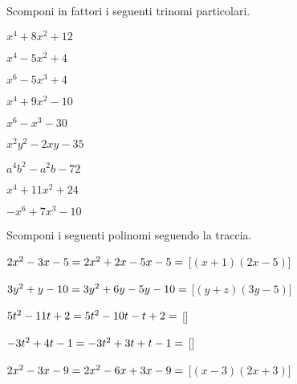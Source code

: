 \begin{esercizio}
 \label{ese:17.5}
 Scomponi in fattori i seguenti trinomi particolari.
 \begin{multicols}{3}
 \begin{enumeratea}
 \item \(x^{4}+8x^{2}+12\)
 \item \(x^{4}-5x^{2}+4\)
 \item \(x^{6}-5x^{3}+4\)
 \item \(x^{4}+9x^{2}-10\)
 \item \(x^{6}-x^{3}-30\)
 \item \(x^{2}y^{2}-2xy-35\)
 \item \(a^{4}b^{2}-a^{2}b-72\)
 \item \(x^{4}+11x^{2}+24\)
 \item \(-x^{6}+7x^{3}-10\)
 \end{enumeratea}
\end{multicols}
\end{esercizio}

\begin{esercizio}[\Ast]
 \label{ese:17.9}
 Scomponi i seguenti polinomi seguendo la traccia.
 \begin{enumeratea}
 \item \(2x^{{2}}-3x-5=2x^{2}+2x-5x-5=\dotfill\) \hfill [\((x+1)(2x-5)\)]
 \item \(3y^{{2}}+y-10 = 3y^{2}+6y-5y-10 =\dotfill\) \hfill [\((y+z)(3y-5)\)]
 \item \(5t^{{2}}-11t+2 = 5t^{2}-10t-t+2 =\dotfill\) \hfill []
 \item \(-3t^{{2}}+4t-1= -3t^{2}+3t+t-1 = \dotfill\) \hfill []
 \item \(2x^{2}-3x-9= 2x^{2}-6x+3x-9 = \dotfill\) \hfill [\((x-3)\left(2x+3\right)\)]
 \end{enumeratea}
\end{esercizio}

